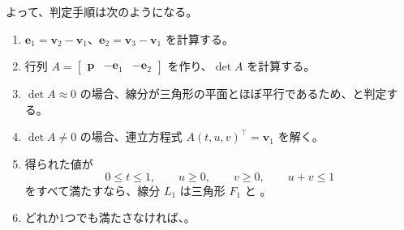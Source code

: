 \documentclass[11pt,a4paper]{ltjsarticle}
\begin{document}
よって、判定手順は次のようになる。
\begin{enumerate}
  \item $\mathbf{e}_1=\mathbf{v}_2-\mathbf{v}_1$、$\mathbf{e}_2=\mathbf{v}_3-\mathbf{v}_1$ を計算する。
  \item 行列 $A=\begin{bmatrix}\mathbf{p}&-\mathbf{e}_1&-\mathbf{e}_2\end{bmatrix}$ を作り、$\det A$ を計算する。
  \item $\det A\approx 0$ の場合、線分が三角形の平面とほぼ平行であるため、と判定する。
  \item $\det A\neq 0$ の場合、連立方程式 $A(t,u,v)^\top=\mathbf{v}_1$ を解く。
  \item 得られた値が
  \[
  0\leq t\leq 1,\qquad u\geq 0,\qquad v\geq 0,\qquad u+v\leq 1
  \]
  をすべて満たすなら、線分 $L_1$ は三角形 $F_1$ と 。
  \item どれか1つでも満たさなければ、。
\end{enumerate}
\end{document}
